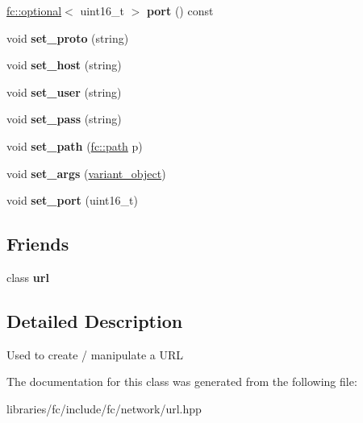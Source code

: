 \begin{DoxyCompactItemize}
\item 
\mbox{\label{classfc_1_1mutable__url_a33a3224c8fe46c127d5cc39e7a7d0ad6}} 
\mbox{\hyperlink{classfc_1_1optional}{fc\+::optional}}$<$ uint16\+\_\+t $>$ {\bfseries port} () const
\item 
\mbox{\label{classfc_1_1mutable__url_a590fbe857d013eefaba2812242501d2f}} 
void {\bfseries set\+\_\+proto} (string)
\item 
\mbox{\label{classfc_1_1mutable__url_a180446d958807857c6f17a029ec33b54}} 
void {\bfseries set\+\_\+host} (string)
\item 
\mbox{\label{classfc_1_1mutable__url_a3efa0f3bc55b042720c7c51c91d19fba}} 
void {\bfseries set\+\_\+user} (string)
\item 
\mbox{\label{classfc_1_1mutable__url_a69902d7f9146a606a382566781024edb}} 
void {\bfseries set\+\_\+pass} (string)
\item 
\mbox{\label{classfc_1_1mutable__url_ac71e9aa4b0418c37621127c26c0c2967}} 
void {\bfseries set\+\_\+path} (\mbox{\hyperlink{classfc_1_1path}{fc\+::path}} p)
\item 
\mbox{\label{classfc_1_1mutable__url_aa12b1ebc1fac4f2e46a3eb3605c58bd6}} 
void {\bfseries set\+\_\+args} (\mbox{\hyperlink{classfc_1_1variant__object}{variant\+\_\+object}})
\item 
\mbox{\label{classfc_1_1mutable__url_ae0ee357192904f4cb37aab09a70fb59f}} 
void {\bfseries set\+\_\+port} (uint16\+\_\+t)
\end{DoxyCompactItemize}
\subsection*{Friends}
\begin{DoxyCompactItemize}
\item 
\mbox{\label{classfc_1_1mutable__url_ac8e4546acf12c4e621b1d729e223cf7d}} 
class {\bfseries url}
\end{DoxyCompactItemize}


\subsection{Detailed Description}
Used to create / manipulate a U\+RL 

The documentation for this class was generated from the following file\+:\begin{DoxyCompactItemize}
\item 
libraries/fc/include/fc/network/url.\+hpp\end{DoxyCompactItemize}

